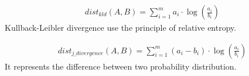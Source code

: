 \begin{definition}
  \begin{gather*}
    dist_{kld}(A, B) = \sum_{i=1}^{m} a_i \cdot \log(\frac{a_i}{b_i})
  \end{gather*}
  Kullback-Leibler divergence use the principle of relative entropy.
\end{definition}

\begin{definition}
  \begin{gather*}
    dist_{j\_divergence}(A, B) = \sum_{i=1}^{m} (a_i - b_i) \cdot \log(\frac{a_i}{b_i})
  \end{gather*}
  It represents the difference between two probability distribution.
\end{definition}
